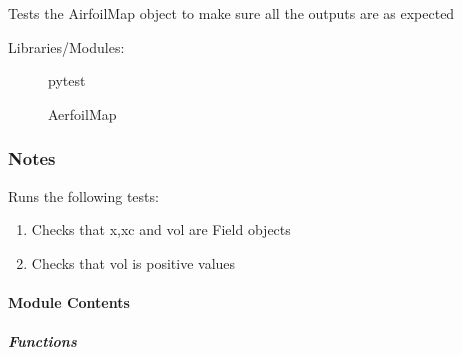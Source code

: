 \documentclass[letterpaper,10pt,english]{sphinxmanual}
\begin{document}
\subsubsection{}
\label{\detokenize{autoapi/tests/test_AirfoilMap/index:module-tests.test_AirfoilMap}}\label{\detokenize{autoapi/tests/test_AirfoilMap/index:tests-test-airfoilmap}}\label{\detokenize{autoapi/tests/test_AirfoilMap/index::doc}}
\sphinxAtStartPar
Tests the AirfoilMap object to make sure all the outputs are as expected
\begin{description}
\item[{Libraries/Modules:}] \leavevmode
\sphinxAtStartPar
pytest

\sphinxAtStartPar
AerfoilMap

\end{description}
\subsubsection*{Notes}

\sphinxAtStartPar
Runs the following tests:
\begin{enumerate}
%
\item {} 
\sphinxAtStartPar
Checks that x,xc and vol are Field objects

\item {} 
\sphinxAtStartPar
Checks that vol is positive values

\end{enumerate}


\paragraph{Module Contents}
\label{\detokenize{autoapi/tests/test_AirfoilMap/index:module-contents}}

\subparagraph{Functions}
\label{\detokenize{autoapi/tests/test_AirfoilMap/index:functions}}
\end{document}
